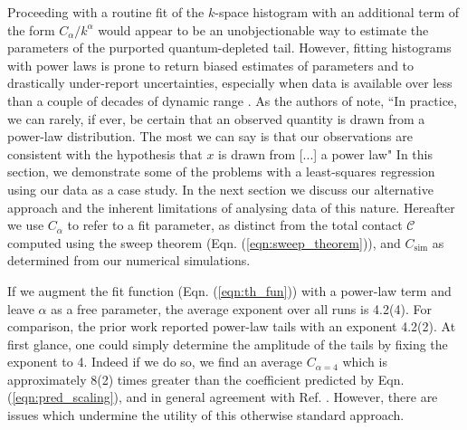	Proceeding with a routine fit of the $k$-space histogram with an additional term of the form $C_\alpha/k^\alpha$ would appear to be an unobjectionable way to estimate the parameters of the purported quantum-depleted tail.
	However, fitting histograms with power laws is prone to return biased estimates of parameters and to drastically under-report uncertainties, especially when data is available over less than a couple of decades of dynamic range \cite{Clauset09,Virkar14}. 
	As the authors of \cite{Clauset09} note, ``In practice, we can rarely, if ever, be certain that an observed quantity is drawn from a power-law distribution. The most we can say is that our observations are consistent with the hypothesis that $x$ is drawn from [...] a power law"
	In this section, we demonstrate some of the problems with a least-squares regression using our data as a case study.
	In the next section we discuss our alternative approach and the inherent limitations of analysing data of this nature.
	Hereafter we use $C_\alpha$ to refer to a fit parameter, as distinct from the total contact $\mathcal{C}$ computed using the sweep theorem (Eqn. (\ref{eqn:sweep_theorem})), and $C_\textrm{sim}$ as determined from our numerical simulations. 
	
	If we augment the  fit function (Eqn. (\ref{eqn:th_fun})) with a power-law term and leave $\alpha$ as a free parameter, the average exponent over all runs is 4.2(4). 
	For comparison, the prior work \cite{Chang16} reported power-law tails with an exponent 4.2(2).
	At first glance, one could simply determine the amplitude of the tails by fixing the exponent to 4.
	Indeed if we do so, we find an average $C_{\alpha=4}$ which is approximately 8(2) times greater than the coefficient predicted by Eqn. (\ref{eqn:pred_scaling}), and in general agreement with Ref. \cite{Chang16}.
	However, there are issues which undermine the utility of this otherwise standard approach.

